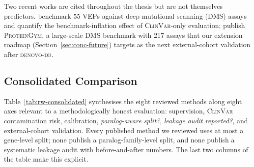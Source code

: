\documentclass[11pt,a4paper,oneside]{report}
\begin{document}
Two recent works are cited throughout the thesis but are not
themselves predictors. \citet{livesey2023benchmark_v2} benchmark 55
VEPs against deep mutational scanning (DMS) assays and quantify the
benchmark-inflation effect of \textsc{ClinVar}-only evaluation;
\citet{notin2023proteingym_v2} publish \textsc{ProteinGym}, a
large-scale DMS benchmark with 217 assays that our extension roadmap
(Section~\ref{sec:conc-future}) targets as the next external-cohort
validation after \textsc{denovo-db}.

\subsection{Consolidated Comparison}
\label{sec:rw-consolidated}

Table~\ref{tab:rw-consolidated} synthesises the eight
reviewed methods along eight axes relevant to a
methodologically honest evaluation: supervision,
\textsc{ClinVar} contamination risk, calibration,
\emph{paralog-aware split?}, \emph{leakage audit
reported?}, and external-cohort validation. Every
published method we reviewed uses at most a gene-level
split; none publish a paralog-family-level split, and
none publish a systematic leakage audit with
before-and-after numbers. The last two columns of the
table make this explicit.
\end{document}
